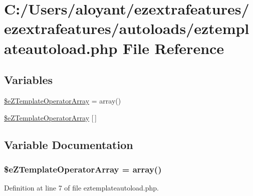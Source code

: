 \hypertarget{eztemplateautoload_8php}{\section{C\-:/\-Users/aloyant/ezextrafeatures/ezextrafeatures/autoloads/eztemplateautoload.php File Reference}
\label{eztemplateautoload_8php}
}
\subsection*{Variables}
\begin{DoxyCompactItemize}
\item 
\hyperlink{eztemplateautoload_8php_a752948546e3085ce995ca4d3af879637}{\$e\-Z\-Template\-Operator\-Array} = array()
\item 
\hyperlink{eztemplateautoload_8php_a495af2bdf40c64a9e0c519ae1f0febd9}{\$e\-Z\-Template\-Operator\-Array} \mbox{[}$\,$\mbox{]}
\end{DoxyCompactItemize}


\subsection{Variable Documentation}
\hypertarget{eztemplateautoload_8php_a752948546e3085ce995ca4d3af879637}{
\subsubsection[{\$e\-Z\-Template\-Operator\-Array}]{\setlength{\rightskip}{0pt plus 5cm}\$e\-Z\-Template\-Operator\-Array = array()}}\label{eztemplateautoload_8php_a752948546e3085ce995ca4d3af879637}


Definition at line 7 of file eztemplateautoload.\-php.

